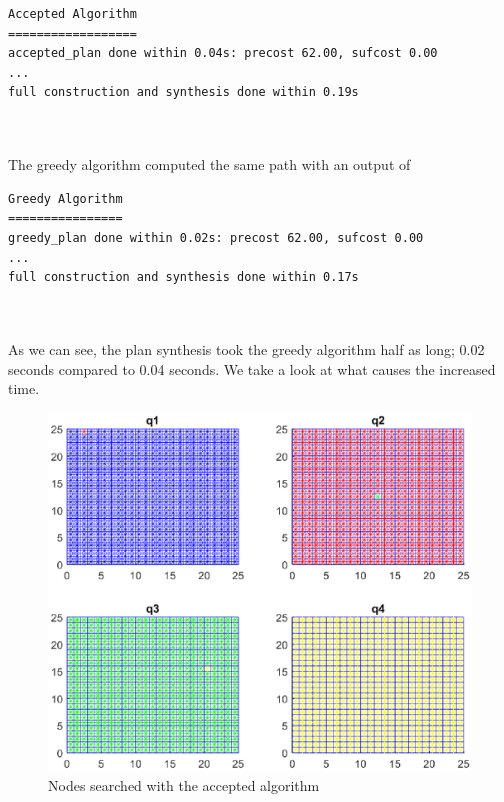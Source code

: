 \begin{minipage}{\textwidth}
\begingroup
\fontsize{9pt}{12pt}\selectfont
\begin{lstlisting}
Accepted Algorithm
==================
accepted_plan done within 0.04s: precost 62.00, sufcost 0.00
...
full construction and synthesis done within 0.19s 
\end{lstlisting}
\endgroup
\end{minipage} \\ \\


The greedy algorithm computed the same path with an output of \\


\begin{minipage}{\textwidth}
\begingroup
\fontsize{9pt}{12pt}\selectfont
\begin{lstlisting}
Greedy Algorithm
================
greedy_plan done within 0.02s: precost 62.00, sufcost 0.00
...
full construction and synthesis done within 0.17s 
\end{lstlisting}
\endgroup
\end{minipage} \\ \\


As we can see, the plan synthesis took the greedy algorithm half as long; 0.02 seconds compared to 0.04 seconds. We take a look at what causes the increased time. 

\begin{figure}[!htb]
\centering
\includegraphics[scale=0.7]{acceptedPlot}
\caption{Nodes searched with the accepted algorithm}
\label{fig:animAccept}
\end{figure}

